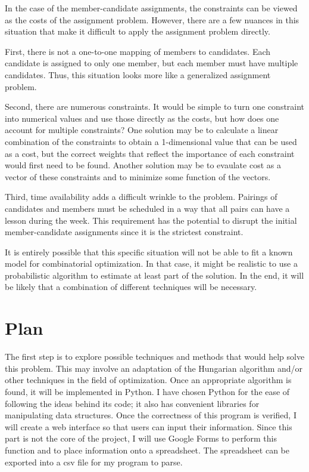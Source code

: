 \documentclass[letterpaper, 12pt]{article}
\begin{document}
In the case of the member-candidate assignments, the constraints can be viewed as the costs of the assignment problem.
However, there are a few nuances in this situation that make it difficult to apply the assignment problem directly.\par

First, there is not a one-to-one mapping of members to candidates. Each candidate is assigned to only one member, but each
member must have multiple candidates. Thus, this situation looks more like a generalized assignment problem. \par

Second, there are numerous constraints. It would be simple to turn one constraint into numerical values and use those
directly as the costs, but how does one account for multiple constraints? One solution may be to calculate a linear
combination of the constraints to obtain a 1-dimensional value that can be used as a cost, but the correct weights that
reflect the importance of each constraint would first need to be found. Another solution may be to evaulate
cost as a vector of these constraints and to minimize some function of the vectors. \par

Third, time availability adds a difficult wrinkle to the problem. Pairings of candidates and members must be scheduled in a
way that all pairs can have a lesson during the week. This requirement has the potential to disrupt the initial
member-candidate assignments since it is the strictest constraint. \par

It is entirely possible that this specific situation will not be able to fit a known model for combinatorial
optimization. In that case, it might be realistic to use a probabilistic algorithm to estimate at least part of the
solution. In the end, it will be likely that a combination of different techniques will be necessary.



\section*{Plan}

The first step is to explore possible techniques and methods that would help solve this problem. This may involve an
adaptation of the Hungarian algorithm and/or other techniques in the field of optimization. Once an appropriate
algorithm is found, it will be implemented in Python. I have chosen Python for the ease of following the ideas behind
its code; it also has convenient libraries for manipulating data structures. Once the correctness of this program is
verified, I will create a web interface so that users can input their information. Since this part is not the core of
the project, I will use Google Forms to perform this function and to place information onto a spreadsheet. The
spreadsheet can be exported into a csv file for my program to parse.
\end{document}
